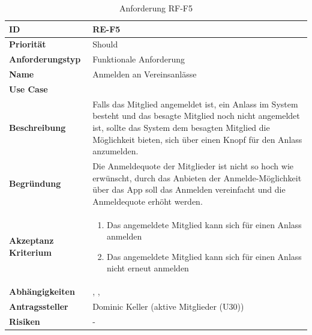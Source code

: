 \begin{table}[ht]
\centering
  \begin{tabular}{ l | p{8cm} }
	\hline
	\rowcolor{gray}
	\textbf{ID} 			&	\textbf{RE-F5}\\ \hline
	\textbf{Priorität} 		&	Should\\ \hline
	\textbf{Anforderungstyp}	&	Funktionale Anforderung\\ \hline
	\textbf{Name} 			&	Anmelden an Vereinsanlässe\\ \hline
	\textbf{Use Case} 		&	\nameref{table:use_case_4}\\ \hline
	\textbf{Beschreibung} 	&	Falls das Mitglied angemeldet ist, ein Anlass im System besteht und das besagte Mitglied noch nicht angemeldet ist, sollte das System dem besagten Mitglied die Möglichkeit bieten, sich über einen Knopf für den Anlass anzumelden.\\ \hline
	\textbf{Begründung} 		&	Die Anmeldequote der Mitglieder ist nicht so hoch wie erwünscht, durch das Anbieten der Anmelde-Möglichkeit über das App soll das Anmelden vereinfacht und die Anmeldequote erhöht werden.\\ \hline
	\textbf{Akzeptanz Kriterium}	&	\begin{enumerate}
					\item Das angemeldete Mitglied kann sich für einen Anlass anmelden
					\item Das angemeldete Mitglied kann sich für einen Anlass nicht erneut anmelden
					\end{enumerate}
					\\ \hline
	\textbf{Abhängigkeiten} 	&	\nameref{table:req_1}, \nameref{table:req_2}, \nameref{table:req_3}\\ \hline
	\textbf{Antragssteller} 	&	Dominic Keller (aktive Mitglieder (U30))\\ \hline
	\textbf{Risiken}	 	&	-
  \end{tabular}
   \caption{Anforderung RF-F5}\label{table:req_5}
\end{table}

